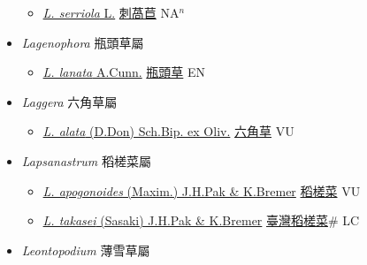 \begin{itemize}
  \begin{itemize}
        \item[] \href{http://www.theplantlist.org/tpl1.1/search?q=Lactuca+serriola}{\textit{L. serriola} L.}   \href{\detokenize{http://taibnet.sinica.edu.tw/chi/taibnet_species_list.php?T2=刺萵苣&T2_new_value=true&fr=y}}{刺萵苣} NA$^n$
  \end{itemize}
 \item[] \textit{Lagenophora} 瓶頭草屬
                    
  \begin{itemize}
        \item[] \href{http://www.theplantlist.org/tpl1.1/search?q=Lagenophora+lanata}{\textit{L. lanata} A.Cunn.}   \href{\detokenize{http://taibnet.sinica.edu.tw/chi/taibnet_species_list.php?T2=瓶頭草&T2_new_value=true&fr=y}}{瓶頭草} EN
  \end{itemize}
 \item[] \textit{Laggera} 六角草屬
                    
  \begin{itemize}
        \item[] \href{http://www.theplantlist.org/tpl1.1/search?q=Laggera+alata}{\textit{L. alata} (D.Don) Sch.Bip. ex Oliv.}   \href{\detokenize{http://taibnet.sinica.edu.tw/chi/taibnet_species_list.php?T2=六角草&T2_new_value=true&fr=y}}{六角草} VU
  \end{itemize}
 \item[] \textit{Lapsanastrum} 稻槎菜屬
                    
  \begin{itemize}
        \item[] \href{http://www.theplantlist.org/tpl1.1/search?q=Lapsanastrum+apogonoides}{\textit{L. apogonoides} (Maxim.) J.H.Pak \& K.Bremer}   \href{\detokenize{http://taibnet.sinica.edu.tw/chi/taibnet_species_list.php?T2=稻槎菜&T2_new_value=true&fr=y}}{稻槎菜} VU
        \item[] \href{http://www.theplantlist.org/tpl1.1/search?q=Lapsanastrum+takasei}{\textit{L. takasei} (Sasaki) J.H.Pak \& K.Bremer}   \href{\detokenize{http://taibnet.sinica.edu.tw/chi/taibnet_species_list.php?T2=臺灣稻槎菜&T2_new_value=true&fr=y}}{臺灣稻槎菜}\# LC
  \end{itemize}
 \item[] \textit{Leontopodium} 薄雪草屬
                    

\end{itemize}
